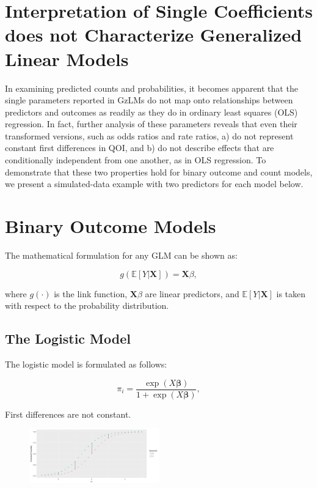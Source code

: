 \documentclass[jou, apacite]{apa6}
\begin{document}
\section{Interpretation of Single Coefficients does not Characterize Generalized Linear Models}
In examining predicted counts and probabilities, it becomes apparent that the single parameters reported in GzLMs do not map onto relationships between predictors and outcomes as readily as they do in ordinary least squares (OLS) regression. In fact, further analysis of these parameters reveals that even their transformed versions, such as odds ratios and rate ratios, a) do not represent constant first differences in QOI, and b) do not describe effects that are conditionally independent from one another, as in OLS regression. To demonstrate that these two properties hold for binary outcome and count models, we present a simulated-data example with two predictors for each model below. 

\section{Binary Outcome Models}

The mathematical formulation for any GLM can be shown as:

\begin{equation}
g(\mathbb{E}[Y|\bm{X}]) = \bm{X} \beta ,
\end{equation}

where $g(\cdot)$ is the link function, $\bm{X}\beta$ are linear predictors, and $\mathbb{E}[Y|\bm{X}]$ is taken with respect to the probability distribution.

\subsection{The Logistic Model}

The logistic model is formulated as follows:

\begin{equation} \label{log1}
\pi_i = \dfrac{\exp (X \bm{\beta})}{1 + \exp (X \bm{\beta})},
\end{equation}

First differences are not constant.

\begin{figure}[h]
\includegraphics[width=0.5\textwidth]{LogisticFirstDiff.png}
\end{figure}
\end{document}
